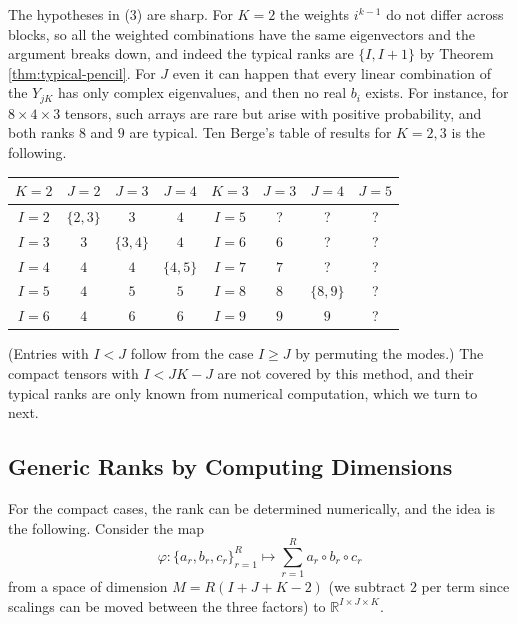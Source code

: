   The hypotheses in (3) are sharp. For $K = 2$ the weights $i^{k-1}$ do not differ across blocks, so all the weighted combinations have the same eigenvectors and the argument breaks down, and indeed the typical ranks are $\{I, I+1\}$ by Theorem \ref{thm:typical-pencil}. For $J$ even it can happen that every linear combination of the $Y_{jK}$ has only complex eigenvalues, and then no real $b_i$ exists. For instance, for $8 \times 4 \times 3$ tensors, such arrays are rare but arise with positive probability, and both ranks $8$ and $9$ are typical. Ten Berge's table of results for $K = 2, 3$ is the following.
  \begin{center}
    \begin{tabular}{c|ccc@{\qquad}c|ccc}
      $K = 2$ & $J = 2$ & $J = 3$ & $J = 4$ & $K = 3$ & $J = 3$ & $J = 4$ & $J = 5$ \\ \hline
      $I = 2$ & $\{2, 3\}$ & $3$ & $4$ & $I = 5$ & ? & ? & ? \\
      $I = 3$ & $3$ & $\{3, 4\}$ & $4$ & $I = 6$ & $6$ & ? & ? \\
      $I = 4$ & $4$ & $4$ & $\{4, 5\}$ & $I = 7$ & $7$ & ? & ? \\
      $I = 5$ & $4$ & $5$ & $5$ & $I = 8$ & $8$ & $\{8, 9\}$ & ? \\
      $I = 6$ & $4$ & $6$ & $6$ & $I = 9$ & $9$ & $9$ & ? \\
    \end{tabular}
  \end{center}
  (Entries with $I < J$ follow from the case $I \geq J$ by permuting the modes.) The compact tensors with $I < JK - J$ are not covered by this method, and their typical ranks are only known from numerical computation, which we turn to next.

\subsection{Generic Ranks by Computing Dimensions}

  For the compact cases, the rank can be determined numerically, and the idea is the following. Consider the map
  \begin{equation}
    \varphi : \{ a_r, b_r, c_r \}_{r=1}^R \mapsto \sum_{r=1}^R a_r \circ b_r \circ c_r
  \end{equation}
  from a space of dimension $M = R(I + J + K - 2)$ (we subtract $2$ per term since scalings can be moved between the three factors) to $\mathbb{R}^{I \times J \times K}$.

